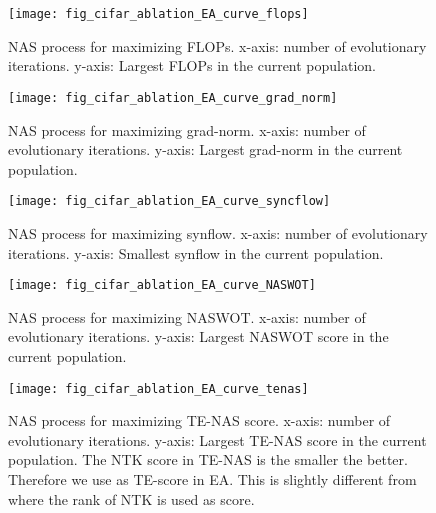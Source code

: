 \documentclass{article}
\begin{document}
\begin{figure}[!h]
   \begin{center}
     \texttt{[image: fig\_cifar\_ablation\_EA\_curve\_flops]}
   \end{center}
 \caption{NAS process for maximizing FLOPs. x-axis: number of evolutionary iterations. y-axis: Largest FLOPs in the current population.}
 \label{fig:fig_cifar_ablation_EA_curve_flops}
\end{figure}

\begin{figure}[!h]
   \begin{center}
     \texttt{[image: fig\_cifar\_ablation\_EA\_curve\_grad\_norm]}
   \end{center}
 \caption{NAS process for maximizing grad-norm. x-axis: number of evolutionary iterations. y-axis: Largest grad-norm in the current population.}
 \label{fig:fig_cifar_ablation_EA_curve_grad_norm}
\end{figure}

\begin{figure}[!h]
   \begin{center}
     \texttt{[image: fig\_cifar\_ablation\_EA\_curve\_syncflow]}
   \end{center}
 \caption{NAS process for maximizing synflow. x-axis: number of evolutionary iterations. y-axis: Smallest synflow in the current population.}
 \label{fig:fig_cifar_ablation_EA_curve_syncflow}
\end{figure}


\begin{figure}[!h]
 \begin{center}
   \texttt{[image: fig\_cifar\_ablation\_EA\_curve\_NASWOT]}
 \end{center}
\caption{NAS process for maximizing NASWOT. x-axis: number of evolutionary iterations. y-axis: Largest NASWOT score in the current population.}
\label{fig:fig_cifar_ablation_EA_curve_NASWOT}
\end{figure}

\begin{figure}[!h]
   \begin{center}
     \texttt{[image: fig\_cifar\_ablation\_EA\_curve\_tenas]}
   \end{center}
 \caption{NAS process for maximizing TE-NAS score. x-axis: number of evolutionary iterations. y-axis: Largest TE-NAS score in the current population. The NTK score in TE-NAS is the smaller the better. Therefore we use  as TE-score in EA. This is slightly different from \cite{chen2021neural} where the rank of NTK is used as score.}
 \label{fig:fig_cifar_ablation_EA_curve_tenas}
\end{figure}
\end{document}
